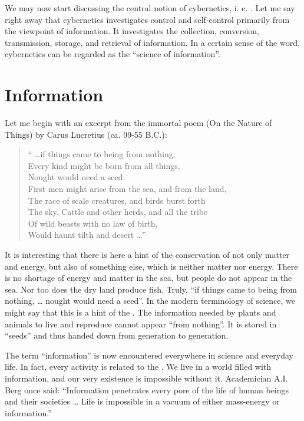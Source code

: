 We may now start discussing the central notion of cybernetics, i. e.
. Let me say right away that cybernetics investigates control
and self-control primarily from the viewpoint of information. It
investigates the collection, conversion, transmission, storage, and
retrieval of information. In a certain sense of the word, cybernetics can
be regarded as the ``science of information''.

\section{Information }

Let me begin with an excerpt from the immortal poem  (On the Nature of Things) by Carus Lucretius (ca. 99-55 B.C.):
\begin{quote}
`` \ldots if things came to being from nothing,\\
Every kind might be born from all things,\\
Nought would need a seed.\\
First men might arise from the sea, and from the land,\\
The race of scale creatures, and birds burst forth \\
The sky. Cattle and other herds, and all the tribe\\
Of wild beasts with no law of birth,\\
Would haunt tilth and desert \ldots ''
\end{quote}
It is interesting that there is here a hint of the conservation of not
only matter and energy, but also of something else, which is neither
matter nor energy. There is no shortage of energy and matter in the sea,
but people do not appear in the sea. Nor too does the dry land produce
fish. Truly, ``if things came to being from nothing, \ldots{} nought would need
a seed''. In the modern terminology of science, we might say that this is
a hint of the . The information needed by
plants and animals to live and reproduce cannot appear ``from nothing''.
It is stored in ``seeds'' and thus handed down from generation to
generation.

The term ``information'' is now encountered everywhere in science and
everyday life. In fact, every activity is related to the . We live in
a world filled with information, and our very existence is impossible
without it. Academician A.I. Berg once said: ``Information penetrates
every pore of the life of human beings and their societies \ldots{} Life is
impossible in a vacuum of either mass-energy or information.''


